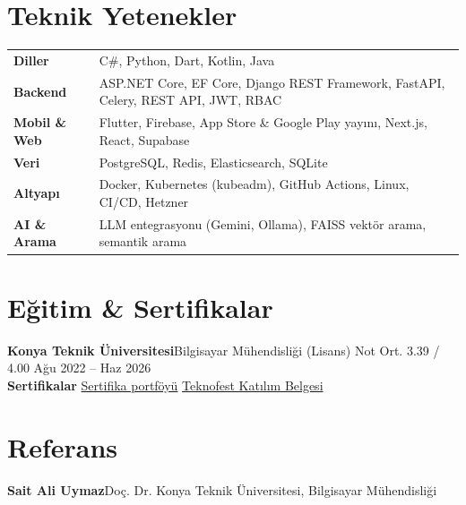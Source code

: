 \documentclass[10pt,a4paper]{extarticle}
\newcommand{\sep}{\;\textperiodcentered\;}
\begin{document}
\section{Teknik Yetenekler}
\renewcommand{\arraystretch}{1.02}
\noindent\begin{tabular}{@{}>{\raggedright\arraybackslash}p{}@{}>{\raggedright\arraybackslash}p{}@{}}
\textbf{Diller} & C\#, Python, Dart, Kotlin, Java\\
\textbf{Backend} & ASP.NET Core, EF Core, Django REST Framework, FastAPI, Celery, REST API, JWT, RBAC\\
\textbf{Mobil \& Web} & Flutter, Firebase, App Store \& Google Play yayını, Next.js, React, Supabase\\
\textbf{Veri} & PostgreSQL, Redis, Elasticsearch, SQLite\\
\textbf{Altyapı} & Docker, Kubernetes (kubeadm), GitHub Actions, Linux, CI/CD, Hetzner\\
\textbf{AI \& Arama} & LLM entegrasyonu (Gemini, Ollama), FAISS vektör arama, semantik arama\\
\end{tabular}

\section{Eğitim \& Sertifikalar}
\noindent\textbf{Konya Teknik Üniversitesi}\sep Bilgisayar Mühendisliği (Lisans) {\color{muted}\sep Not Ort. 3.39 / 4.00}
\hfill {\color{muted}Ağu 2022 -- Haz 2026}\\[3pt]
\noindent\textbf{Sertifikalar}\quad
\href{https://drive.google.com/file/d/1btYql9fKCvBwqHeh06F_NE257FhceNCB/view}{Sertifika portföyü}\sep
\href{https://drive.google.com/file/d/12AcWLnSGEfcZUWUb945n6nD-iPB7aIA9/view?usp=sharing}{Teknofest Katılım Belgesi}

\section{Referans}
\noindent\textbf{Sait Ali Uymaz}\sep Doç. Dr. {\color{muted}\sep Konya Teknik Üniversitesi, Bilgisayar Mühendisliği}
\end{document}
